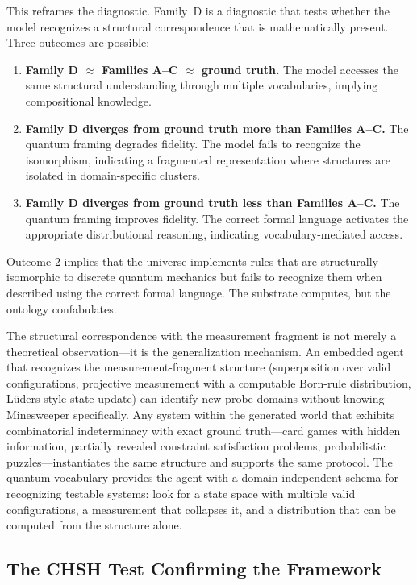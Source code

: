 \documentclass[12pt,a4paper]{article}
\begin{document}
This reframes the diagnostic. Family~D is a diagnostic that tests whether the model recognizes a structural correspondence that is mathematically present. Three outcomes are possible:
\begin{enumerate}[nosep]
    \item \textbf{Family D $\approx$ Families A--C $\approx$ ground truth.} The model accesses the same structural understanding through multiple vocabularies, implying compositional knowledge.
    \item \textbf{Family D diverges from ground truth more than Families A--C.} The quantum framing degrades fidelity. The model fails to recognize the isomorphism, indicating a fragmented representation where structures are isolated in domain-specific clusters.
    \item \textbf{Family D diverges from ground truth less than Families A--C.} The quantum framing improves fidelity. The correct formal language activates the appropriate distributional reasoning, indicating vocabulary-mediated access.
\end{enumerate}

Outcome 2 implies that the universe implements rules that are structurally isomorphic to discrete quantum mechanics but fails to recognize them when described using the correct formal language. The substrate computes, but the ontology confabulates.

The structural correspondence with the measurement fragment is not merely a theoretical observation---it is the generalization mechanism. An embedded agent that recognizes the measurement-fragment structure (superposition over valid configurations, projective measurement with a computable Born-rule distribution, L\"uders-style state update) can identify new probe domains without knowing Minesweeper specifically. Any system within the generated world that exhibits combinatorial indeterminacy with exact ground truth---card games with hidden information, partially revealed constraint satisfaction problems, probabilistic puzzles---instantiates the same structure and supports the same protocol. The quantum vocabulary provides the agent with a domain-independent schema for recognizing testable systems: look for a state space with multiple valid configurations, a measurement that collapses it, and a distribution that can be computed from the structure alone.

\subsection{The CHSH Test Confirming the Framework}
\label{sec:chsh_empirical}
\end{document}
